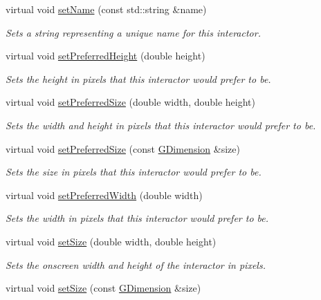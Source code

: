 \begin{DoxyCompactItemize}
virtual void \mbox{\hyperlink{classGInteractor_a9d3a2685df23b5e7cbf59c19c4a1f9b5}{set\+Name}} (const std\+::string \&name)
\begin{DoxyCompactList}\small\item\em Sets a string representing a unique name for this interactor. \end{DoxyCompactList}\item 
virtual void \mbox{\hyperlink{classGInteractor_a1ab987704fce32098706c6f00fb08218}{set\+Preferred\+Height}} (double height)
\begin{DoxyCompactList}\small\item\em Sets the height in pixels that this interactor would prefer to be. \end{DoxyCompactList}\item 
virtual void \mbox{\hyperlink{classGInteractor_a042c5ae19430d765ef552371cae3632c}{set\+Preferred\+Size}} (double width, double height)
\begin{DoxyCompactList}\small\item\em Sets the width and height in pixels that this interactor would prefer to be. \end{DoxyCompactList}\item 
virtual void \mbox{\hyperlink{classGInteractor_aa22d9be4bc0e078bb0ea69b0fc9d7c75}{set\+Preferred\+Size}} (const \mbox{\hyperlink{classGDimension}{G\+Dimension}} \&size)
\begin{DoxyCompactList}\small\item\em Sets the size in pixels that this interactor would prefer to be. \end{DoxyCompactList}\item 
virtual void \mbox{\hyperlink{classGInteractor_a3db429ab2fa52efd187eec0ed8cdd9f2}{set\+Preferred\+Width}} (double width)
\begin{DoxyCompactList}\small\item\em Sets the width in pixels that this interactor would prefer to be. \end{DoxyCompactList}\item 
virtual void \mbox{\hyperlink{classGInteractor_aca25d49481f9bf5fc8f7df4c086c4ce7}{set\+Size}} (double width, double height)
\begin{DoxyCompactList}\small\item\em Sets the onscreen width and height of the interactor in pixels. \end{DoxyCompactList}\item 
virtual void \mbox{\hyperlink{classGInteractor_ae2b628228f192c2702c4ce941b2af68f}{set\+Size}} (const \mbox{\hyperlink{classGDimension}{G\+Dimension}} \&size)

\end{DoxyCompactItemize}
